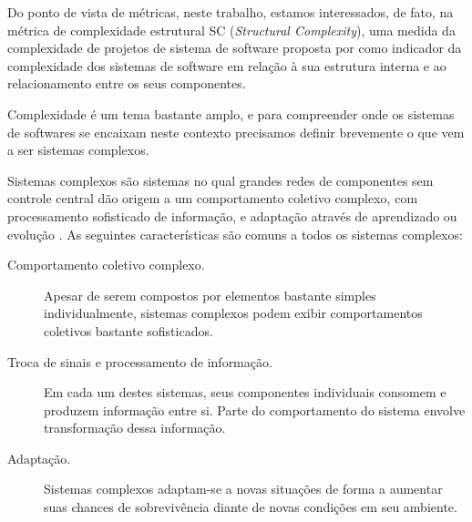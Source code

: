 
Do ponto de vista de métricas, neste trabalho, estamos interessados, de fato, na métrica
de complexidade estrutural SC ({\it Structural Complexity}), uma medida da
complexidade de projetos de sistema de software proposta por
 como indicador da complexidade dos sistemas de software
em relação à sua estrutura interna e ao relacionamento entre os seus
componentes.

Complexidade é um tema bastante amplo, e para compreender onde os
sistemas de softwares se encaixam neste contexto precisamos definir brevemente
o que vem a ser sistemas complexos.

Sistemas complexos são sistemas no qual grandes redes de componentes sem
controle central dão origem a um comportamento
coletivo complexo, com processamento sofisticado de informação, e adaptação
através de aprendizado ou evolução \cite{Mitchell2009}. As seguintes
características são comuns a todos os sistemas complexos:

\begin{description}

  \item[Comportamento coletivo complexo.] Apesar de serem compostos por
  elementos bastante simples individualmente, sistemas complexos podem exibir
  comportamentos coletivos bastante sofisticados.

  \item[Troca de sinais e processamento de informação.] Em cada um destes
  sistemas, seus componentes individuais consomem e produzem informação entre
  si. Parte do comportamento do sistema envolve transformação dessa informação.

  \item[Adaptação.] Sistemas complexos adaptam-se a novas situações de forma a
  aumentar suas chances de sobrevivência diante de novas condições em seu
  ambiente.

\end{description}

